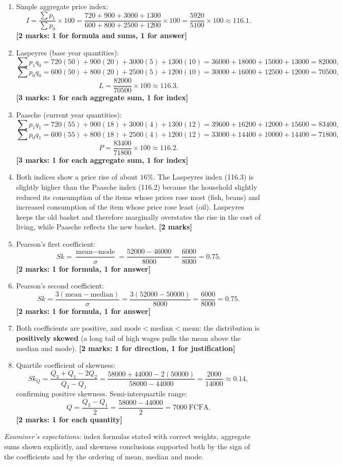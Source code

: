 \documentclass[11pt]{article}
\begin{document}
\begin{corrige}
\begin{enumerate}
\item Simple aggregate price index:
\[
I = \frac{\sum p_1}{\sum p_0}\times 100 = \frac{720 + 900 + 3000 + 1300}{600 + 800 + 2500 + 1200}\times 100 = \frac{5920}{5100}\times 100 \approx 116.1.
\]
\textbf{[2 marks: 1 for formula and sums, 1 for answer]}
\item Laspeyres (base year quantities):
\[
\sum p_1 q_0 = 720(50) + 900(20) + 3000(5) + 1300(10) = 36000 + 18000 + 15000 + 13000 = 82000,
\]
\[
\sum p_0 q_0 = 600(50) + 800(20) + 2500(5) + 1200(10) = 30000 + 16000 + 12500 + 12000 = 70500,
\]
\[
L = \frac{82000}{70500}\times 100 \approx 116.3.
\]
\textbf{[3 marks: 1 for each aggregate sum, 1 for index]}
\item Paasche (current year quantities):
\[
\sum p_1 q_1 = 720(55) + 900(18) + 3000(4) + 1300(12) = 39600 + 16200 + 12000 + 15600 = 83400,
\]
\[
\sum p_0 q_1 = 600(55) + 800(18) + 2500(4) + 1200(12) = 33000 + 14400 + 10000 + 14400 = 71800,
\]
\[
P = \frac{83400}{71800}\times 100 \approx 116.2.
\]
\textbf{[3 marks: 1 for each aggregate sum, 1 for index]}
\item Both indices show a price rise of about $16\%$. The Laspeyres index (116.3) is slightly higher than the Paasche index (116.2) because the household slightly reduced its consumption of the items whose prices rose most (fish, beans) and increased consumption of the item whose price rose least (oil). Laspeyres keeps the old basket and therefore marginally overstates the rise in the cost of living, while Paasche reflects the new basket. \hfill \textbf{[2 marks]}
\item Pearson's first coefficient:
\[
Sk = \frac{\text{mean} - \text{mode}}{\sigma} = \frac{52000 - 46000}{8000} = \frac{6000}{8000} = 0.75.
\]
\textbf{[2 marks: 1 for formula, 1 for answer]}
\item Pearson's second coefficient:
\[
Sk = \frac{3(\text{mean} - \text{median})}{\sigma} = \frac{3(52000 - 50000)}{8000} = \frac{6000}{8000} = 0.75.
\]
\textbf{[2 marks: 1 for formula, 1 for answer]}
\item Both coefficients are positive, and $\text{mode} < \text{median} < \text{mean}$: the distribution is \textbf{positively skewed} (a long tail of high wages pulls the mean above the median and mode). \hfill \textbf{[2 marks: 1 for direction, 1 for justification]}
\item Quartile coefficient of skewness:
\[
Sk_Q = \frac{Q_3 + Q_1 - 2Q_2}{Q_3 - Q_1} = \frac{58000 + 44000 - 2(50000)}{58000 - 44000} = \frac{2000}{14000} \approx 0.14,
\]
confirming positive skewness. Semi-interquartile range:
\[
Q = \frac{Q_3 - Q_1}{2} = \frac{58000 - 44000}{2} = 7000\ \text{FCFA}.
\]
\textbf{[2 marks: 1 for each quantity]}
\end{enumerate}
\emph{Examiner's expectations:} index formulas stated with correct weights, aggregate sums shown explicitly, and skewness conclusions supported both by the sign of the coefficients and by the ordering of mean, median and mode.
\end{corrige}
\end{document}
